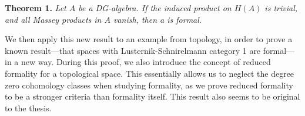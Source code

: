 \textbf{Theorem 1.} \textit{Let $A$ be a DG-algebra. If the induced product on $H(A)$ is trivial, and all Massey products in $A$ vanish, then a is formal.}

We then apply this new result to an example from topology, in order to prove a known result---that spaces with Lusternik-Schnirelmann category 1 are formal---in a new way. During this proof, we also introduce the concept of reduced formality for a topological space. This essentially allows us to neglect the degree zero cohomology classes when studying formality, as we prove reduced formality to be a stronger criteria than formality itself. This result also seems to be original to the thesis. 

 
 






